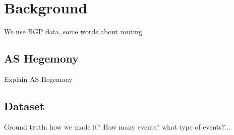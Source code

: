 \section{Background}

We use BGP data, some words about routing

\subsection{AS Hegemony}

Explain AS Hegemony

\subsection{Dataset}

Ground truth: how we made it? How many events? what type of events?...
